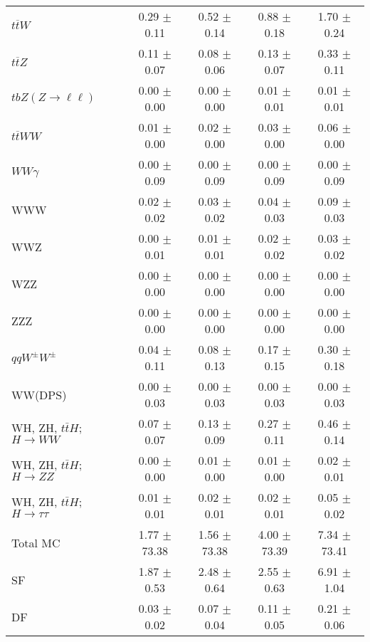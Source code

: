 \begin{tabular}{l|cccc}
                   $t\overline{t}W$ &  0.29 $\pm$  0.11 &  0.52 $\pm$  0.14 &  0.88 $\pm$  0.18 &  1.70 $\pm$  0.24 \\
                   $t\overline{t}Z$ &  0.11 $\pm$  0.07 &  0.08 $\pm$  0.06 &  0.13 $\pm$  0.07 &  0.33 $\pm$  0.11 \\
    $tbZ (Z \rightarrow \ell \ell)$ &  0.00 $\pm$  0.00 &  0.00 $\pm$  0.00 &  0.01 $\pm$  0.01 &  0.01 $\pm$  0.01 \\
                  $t\overline{t}WW$ &  0.01 $\pm$  0.00 &  0.02 $\pm$  0.00 &  0.03 $\pm$  0.00 &  0.06 $\pm$  0.00 \\
                         $WW\gamma$ &  0.00 $\pm$  0.09 &  0.00 $\pm$  0.09 &  0.00 $\pm$  0.09 &  0.00 $\pm$  0.09 \\
                                WWW &  0.02 $\pm$  0.02 &  0.03 $\pm$  0.02 &  0.04 $\pm$  0.03 &  0.09 $\pm$  0.03 \\
                                WWZ &  0.00 $\pm$  0.01 &  0.01 $\pm$  0.01 &  0.02 $\pm$  0.02 &  0.03 $\pm$  0.02 \\
                                WZZ &  0.00 $\pm$  0.00 &  0.00 $\pm$  0.00 &  0.00 $\pm$  0.00 &  0.00 $\pm$  0.00 \\
                                ZZZ &  0.00 $\pm$  0.00 &  0.00 $\pm$  0.00 &  0.00 $\pm$  0.00 &  0.00 $\pm$  0.00 \\
                 $qqW^{\pm}W^{\pm}$ &  0.04 $\pm$  0.11 &  0.08 $\pm$  0.13 &  0.17 $\pm$  0.15 &  0.30 $\pm$  0.18 \\
                            WW(DPS) &  0.00 $\pm$  0.03 &  0.00 $\pm$  0.03 &  0.00 $\pm$  0.03 &  0.00 $\pm$  0.03 \\
WH, ZH, $t\bar{t}H$; $H \rightarrow WW$ &  0.07 $\pm$  0.07 &  0.13 $\pm$  0.09 &  0.27 $\pm$  0.11 &  0.46 $\pm$  0.14 \\
WH, ZH, $t\bar{t}H$; $H \rightarrow ZZ$ &  0.00 $\pm$  0.00 &  0.01 $\pm$  0.00 &  0.01 $\pm$  0.00 &  0.02 $\pm$  0.01 \\
WH, ZH, $t\bar{t}H$; $H \rightarrow \tau\tau$ &  0.01 $\pm$  0.01 &  0.02 $\pm$  0.01 &  0.02 $\pm$  0.01 &  0.05 $\pm$  0.02 \\
\hline\hline
                           Total MC &  1.77 $\pm$ 73.38 &  1.56 $\pm$ 73.38 &  4.00 $\pm$ 73.39 &  7.34 $\pm$ 73.41 \\
\hline
                                 SF &  1.87 $\pm$  0.53 &  2.48 $\pm$  0.64 &  2.55 $\pm$  0.63 &  6.91 $\pm$  1.04 \\
                                 DF &  0.03 $\pm$  0.02 &  0.07 $\pm$  0.04 &  0.11 $\pm$  0.05 &  0.21 $\pm$  0.06 \\

\end{tabular}
